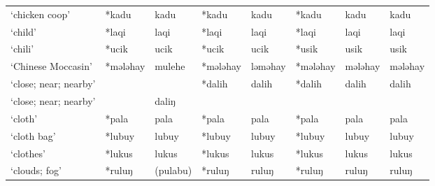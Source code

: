 \begin{landscape}
\begin{longtable}[c]{@{}p{3cm}<{\raggedright}p{2.75cm}<{\raggedright}p{2.75cm}<{\raggedright}p{2.75cm}<{\raggedright}p{2.75cm}<{\raggedright}p{2.75cm}<{\raggedright}p{2.75cm}<{\raggedright}p{2.75cm}<{\raggedright}@{}}
`chicken coop'                                       & *kadu              & kadu                           & *kadu              & kadu                       & *kadu            & kadu                     & kadu                              \\
`child'                                              & *laqi              & laqi                           & *laqi              & laqi                       & *laqi            & laqi                     & laqi                              \\
`chili'                                              & *ucik              & ucik                           & *ucik              & ucik                       & *usik            & usik                     & usik                              \\
`Chinese Moccasin'                                   & *mələhay           & mulehe                         & *mələhay           & ləməhay                    & *mələhay         & mələhay                  & mələhay                           \\
`close; near; nearby'                                &              &                                & *dalih             & dalih                      & *dalih           & dalih                    & dalih                             \\
`close; near; nearby'                                &              & daliŋ                          &                    &                            &                  &                          &                                   \\
`cloth'                                              & *pala              & pala                           & *pala              & pala                       & *pala            & pala                     & pala                              \\
`cloth bag'                                          & *lubuy             & lubuy                          & *lubuy             & lubuy                      & *lubuy           & lubuy                    & lubuy                             \\
`clothes'                                            & *lukus             & lukus                          & *lukus             & lukus                      & *lukus           & lukus                    & lukus                             \\
`clouds; fog'                                        & *ruluŋ             & (pulabu)                       & *ruluŋ             & ruluŋ                      & *ruluŋ           & ruluŋ                    & ruluŋ                             \\

\end{longtable}
\end{landscape}
